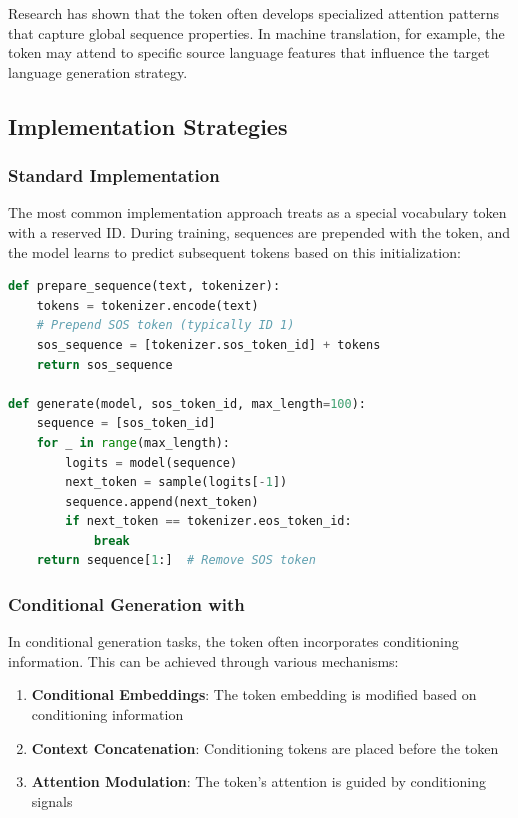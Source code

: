 Research has shown that the \sos{} token often develops specialized attention patterns that capture global sequence properties. In machine translation, for example, the \sos{} token may attend to specific source language features that influence the target language generation strategy.

\subsection{Implementation Strategies}

\subsubsection{Standard Implementation}

The most common implementation approach treats \sos{} as a special vocabulary token with a reserved ID. During training, sequences are prepended with the \sos{} token, and the model learns to predict subsequent tokens based on this initialization:

\begin{lstlisting}[language=Python, caption=Standard \sos{} token implementation]
def prepare_sequence(text, tokenizer):
    tokens = tokenizer.encode(text)
    # Prepend SOS token (typically ID 1)
    sos_sequence = [tokenizer.sos_token_id] + tokens
    return sos_sequence

def generate(model, sos_token_id, max_length=100):
    sequence = [sos_token_id]
    for _ in range(max_length):
        logits = model(sequence)
        next_token = sample(logits[-1])
        sequence.append(next_token)
        if next_token == tokenizer.eos_token_id:
            break
    return sequence[1:]  # Remove SOS token
\end{lstlisting}

\subsubsection{Conditional Generation with \sos{}}

In conditional generation tasks, the \sos{} token often incorporates conditioning information. This can be achieved through various mechanisms:

\begin{enumerate}
\item \textbf{Conditional Embeddings}: The \sos{} token embedding is modified based on conditioning information
\item \textbf{Context Concatenation}: Conditioning tokens are placed before the \sos{} token
\item \textbf{Attention Modulation}: The \sos{} token's attention is guided by conditioning signals
\end{enumerate}

